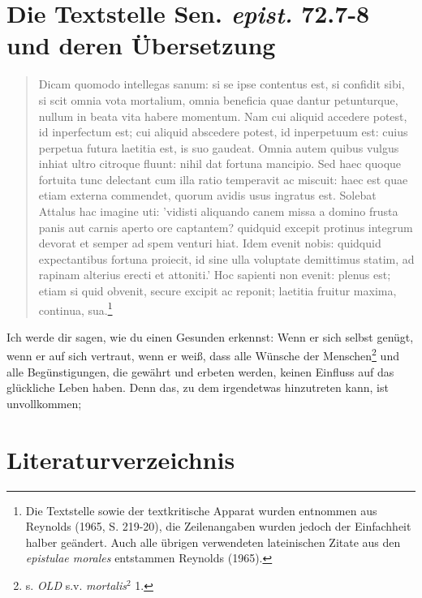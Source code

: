 \documentclass[12pt,a4paper]{article}
\begin{document}
\section{Die Textstelle Sen. \textit{epist.} 72.7-8 und deren Übersetzung}
\begin{singlespace}
\renewcommand\linenumberfont{\normalfont\small}
\begin{linenumbers}
\begin{quotation}
\selectfont
Dicam quomodo intellegas sanum: si se ipse contentus est, si confidit sibi, si scit omnia vota mortalium, omnia beneficia quae dantur petunturque, nullum in beata vita habere momentum. Nam cui aliquid accedere potest, id inperfectum est; cui aliquid abscedere potest, id inperpetuum est: cuius perpetua futura laetitia est, is suo gaudeat. Omnia autem quibus vulgus inhiat ultro citroque fluunt: nihil dat fortuna mancipio. Sed haec quoque fortuita tunc delectant cum illa ratio temperavit ac miscuit: haec est quae etiam externa commendet, quorum avidis usus ingratus est. Solebat Attalus hac imagine uti: 'vidisti aliquando canem missa a domino frusta panis aut carnis aperto ore captantem? quidquid excepit protinus integrum devorat et semper ad spem venturi hiat. Idem evenit nobis: quid\-quid expectantibus fortuna proiecit, id sine ulla voluptate demittimus statim, ad rapinam alterius erecti et attoniti.' Hoc sapienti non evenit: plenus est; etiam si quid obvenit, secure excipit ac reponit; laetitia fruitur maxima, continua, sua.\footnote{Die Textstelle sowie der textkritische Apparat wurden entnommen aus Reynolds (1965, S. 219-20), die Zeilenangaben wurden jedoch der Einfachheit halber geändert. Auch alle übrigen verwendeten lateinischen Zitate aus den \textit{epistulae morales} entstammen Reynolds (1965).}
\end{quotation}
\end{linenumbers}
\vspace{0.5cm}
\selectfont
Ich werde dir sagen, wie du einen Gesunden erkennst: Wenn er sich selbst genügt, wenn er auf sich vertraut, wenn er weiß, dass alle Wünsche der Menschen\footnote{s. \textit{OLD} s.v. \textit{mortalis$^{2}$} 1.} und alle Begünstigungen, die gewährt und erbeten werden, keinen Einfluss auf das glückliche Leben haben. Denn das, zu dem irgendetwas hinzutreten kann, ist unvollkommen; 
\end{singlespace}
%
\pagebreak
\section*{Literaturverzeichnis}
\bibbycategory
{}
\end{document}

